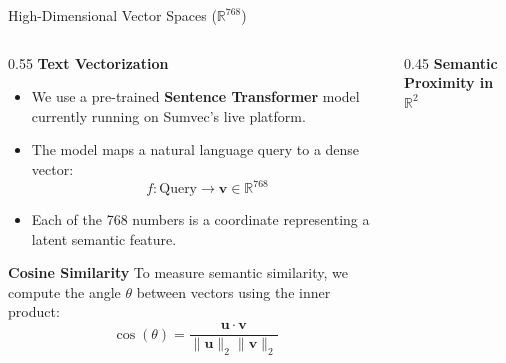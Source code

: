 \documentclass[9pt]{beamer}
\begin{document}
\begin{frame}{High-Dimensional Vector Spaces (\(\mathbb{R}^{768}\))}
    \begin{columns}
        \begin{column}{0.55\textwidth}
            \textbf{Text Vectorization}
            \begin{itemize}
                \item We use a pre-trained \textbf{Sentence Transformer} model currently running on Sumvec's live platform.
                \item The model maps a natural language query to a dense vector:
                \[
                f: \text{Query} \rightarrow \mathbf{v} \in \mathbb{R}^{768}
                \]
                \item Each of the 768 numbers is a coordinate representing a latent semantic feature.
            \end{itemize}
            \vspace{0.45cm}
            \textbf{Cosine Similarity}
            To measure semantic similarity, we compute the angle $\theta$ between vectors using the inner product:
            \[
            \cos(\theta) = \frac{\mathbf{u} \cdot \mathbf{v}}{\|\mathbf{u}\|_2 \|\mathbf{v}\|_2}
            \]
        \end{column}
        
        \begin{column}{0.45\textwidth}
            \centering
            \textbf{\small Semantic Proximity in \(\mathbb{R}^2\)}
            \vspace{0.3cm}
            
        \end{column}
    \end{columns}
\end{frame}
\end{document}

